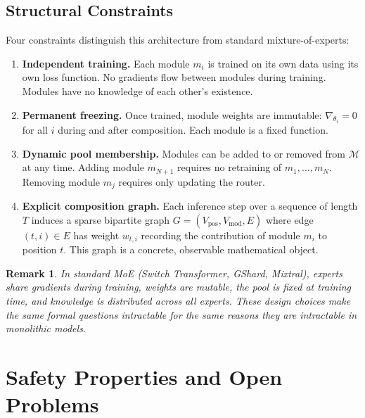 \documentclass[11pt,a4paper]{article}
\newtheorem{remark}{Remark}
\begin{document}
\subsection{Structural Constraints}

Four constraints distinguish this architecture from standard mixture-of-experts:

\begin{enumerate}[nosep,leftmargin=*]
  \item \textbf{Independent training.} Each module $m_i$ is trained on its own data using its own loss function. No gradients flow between modules during training. Modules have no knowledge of each other's existence.
  
  \item \textbf{Permanent freezing.} Once trained, module weights are immutable: $\nabla_{\theta_i} = 0$ for all $i$ during and after composition. Each module is a fixed function.
  
  \item \textbf{Dynamic pool membership.} Modules can be added to or removed from $\mathcal{M}$ at any time. Adding module $m_{N+1}$ requires no retraining of $m_1, \ldots, m_N$. Removing module $m_j$ requires only updating the router.
  
  \item \textbf{Explicit composition graph.} Each inference step over a sequence of length $T$ induces a sparse bipartite graph $G = (V_{\text{pos}}, V_{\text{mod}}, E)$ where edge $(t, i) \in E$ has weight $w_{t,i}$ recording the contribution of module $m_i$ to position $t$. This graph is a concrete, observable mathematical object.
\end{enumerate}

\begin{remark}
In standard MoE (Switch Transformer, GShard, Mixtral), experts share gradients during training, weights are mutable, the pool is fixed at training time, and knowledge is distributed across all experts. These design choices make the same formal questions intractable for the same reasons they are intractable in monolithic models.
\end{remark}

\section{Safety Properties and Open Problems}
\label{sec:properties}
\end{document}
